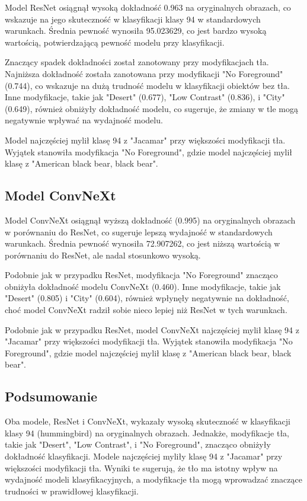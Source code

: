 Model ResNet osiągnął wysoką dokładność 0.963 na oryginalnych obrazach, co wskazuje na jego skuteczność w klasyfikacji klasy 94 w standardowych warunkach. Średnia pewność wynosiła 95.023629, co jest bardzo wysoką wartością, potwierdzającą pewność modelu przy klasyfikacji.

Znaczący spadek dokładności został zanotowany przy modyfikacjach tła. Najniższa dokładność została zanotowana przy modyfikacji "No Foreground" (0.744), co wskazuje na dużą trudność modelu w klasyfikacji obiektów bez tła. Inne modyfikacje, takie jak "Desert" (0.677), "Low Contrast" (0.836), i "City" (0.649), również obniżyły dokładność modelu, co sugeruje, że zmiany w tle mogą negatywnie wpływać na wydajność modelu.

Model najczęściej mylił klasę 94 z "Jacamar" przy większości modyfikacji tła. Wyjątek stanowiła modyfikacja "No Foreground", gdzie model najczęściej mylił klasę z "American black bear, black bear".

\subsection*{Model ConvNeXt}

Model ConvNeXt osiągnął wyższą dokładność (0.995) na oryginalnych obrazach w porównaniu do ResNet, co sugeruje lepszą wydajność w standardowych warunkach. Średnia pewność wynosiła 72.907262, co jest niższą wartością w porównaniu do ResNet, ale nadal stosunkowo wysoką.

Podobnie jak w przypadku ResNet, modyfikacja "No Foreground" znacząco obniżyła dokładność modelu ConvNeXt (0.460). Inne modyfikacje, takie jak "Desert" (0.805) i "City" (0.604), również wpłynęły negatywnie na dokładność, choć model ConvNeXt radził sobie nieco lepiej niż ResNet w tych warunkach.

Podobnie jak w przypadku ResNet, model ConvNeXt najczęściej mylił klasę 94 z "Jacamar" przy większości modyfikacji tła. Wyjątek stanowiła modyfikacja "No Foreground", gdzie model najczęściej mylił klasę z "American black bear, black bear".

\subsection*{Podsumowanie}

Oba modele, ResNet i ConvNeXt, wykazały wysoką skuteczność w klasyfikacji klasy 94 (hummingbird) na oryginalnych obrazach. Jednakże, modyfikacje tła, takie jak "Desert", "Low Contrast", i "No Foreground", znacząco obniżyły dokładność klasyfikacji. Modele najczęściej myliły klasę 94 z "Jacamar" przy większości modyfikacji tła. Wyniki te sugerują, że tło ma istotny wpływ na wydajność modeli klasyfikacyjnych, a modyfikacje tła mogą wprowadzać znaczące trudności w prawidłowej klasyfikacji.

